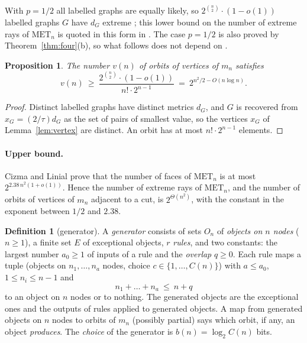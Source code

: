 \documentclass[11pt,a4paper]{article}
\newtheorem{proposition}[theorem]{Proposition}
\theoremstyle{definition}
\newtheorem*{definition}{Definition}
\theoremstyle{remark}
\newcommand{\MET}{\mathrm{MET}}
\begin{document}
With $p = 1/2$ all labelled graphs are equally likely, so $2^{\binom n2}\cdot(1 - o(1))$ labelled graphs $G$ have
$d_G$ extreme \cite[p.~138]{A80}; this lower bound on the number of extreme rays of $\MET_n$ is quoted in this form
in \cite[\S5.1]{CL25}. The case $p = 1/2$ is also proved by Theorem~\ref{thm:four}(b), so what follows does not
depend on \cite[Thm 3.3]{A80}.

\begin{proposition}\label{prop:count}
The number $v(n)$ of orbits of vertices of $m_n$ satisfies
\[
  v(n) \ \ge\ \frac{2^{\binom n2}\cdot(1 - o(1))}{n!\cdot 2^{n-1}} \ =\ 2^{n^2/2 - O(n \log n)}.
\]
\end{proposition}

\begin{proof}
Distinct labelled graphs have distinct metrics $d_G$, and $G$ is recovered from $x_G = (2/\tau)d_G$ as the set of
pairs of smallest value, so the vertices $x_G$ of Lemma~\ref{lem:vertex} are distinct. An orbit has at most
$n!\cdot 2^{n-1}$ elements.
\end{proof}

\paragraph{Upper bound.} Cizma and Linial \cite[Thm 5.5]{CL25} prove that the number of faces of $\MET_n$ is at
most $2^{2.38\,n^2(1+o(1))}$. Hence the number of extreme rays of $\MET_n$, and the number of orbits of vertices of
$m_n$ adjacent to a cut, is $2^{\Theta(n^2)}$, with the constant in the exponent between $1/2$ and $2.38$.

\begin{definition}[generator]
A \emph{generator} consists of sets $O_n$ of \emph{objects on $n$ nodes} ($n \ge 1$), a finite set $E$ of
exceptional objects, $r$ \emph{rules}, and two constants: the largest number $a_0 \ge 1$ of inputs of a rule and the
\emph{overlap} $q \ge 0$. Each rule maps a tuple (objects on $n_1, \dots, n_a$ nodes, choice
$c \in \{1, \dots, C(n)\}$) with $a \le a_0$, $1 \le n_i \le n - 1$ and
\[
  n_1 + \dots + n_a \ \le\ n + q
\]
to an object on $n$ nodes or to nothing. The generated objects are the exceptional ones and the outputs of rules
applied to generated objects. A map from generated objects on $n$ nodes to orbits of $m_n$ (possibly partial) says
which orbit, if any, an object \emph{produces}. The \emph{choice} of the generator is $b(n) = \log_2 C(n)$ bits.
\end{definition}
\end{document}
